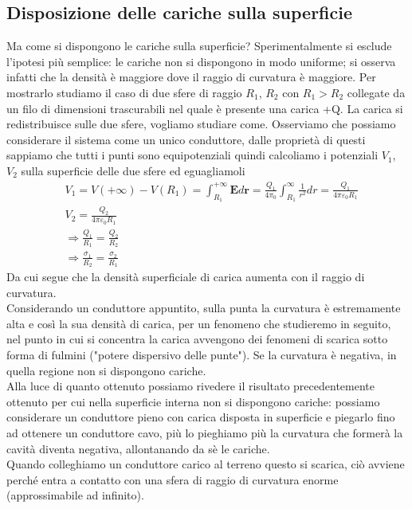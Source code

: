 \documentclass[10pt,a4paper]{article}
\begin{document}
\subsection{Disposizione delle cariche sulla superficie}
Ma come si dispongono le cariche sulla superficie? Sperimentalmente si esclude l'ipotesi più semplice: le cariche non si dispongono in modo uniforme; si osserva infatti che la densità è maggiore dove il raggio di curvatura è maggiore. Per mostrarlo studiamo il caso di due sfere di raggio \(R_1\), \(R_2\) con \(R_1>R_2\) collegate da un filo di dimensioni trascurabili nel quale è presente una carica +Q. La carica si redistribuisce sulle due sfere, vogliamo studiare come. Osserviamo che possiamo considerare il sistema come un unico conduttore, dalle proprietà di questi sappiamo che tutti i punti sono equipotenziali quindi calcoliamo i potenziali \(V_1\), \(V_2\) sulla superficie delle due sfere ed eguagliamoli
\begin{align*}
	&V_1 = V(+\infty) - V(R_1) = \int_{R_1}^{+\infty} \mathbf{E}d\mathbf{r} =  \frac{Q_1}{4\pi_0}\int_{R_1}^{\infty}\frac{1}{r^2}dr = \frac{Q_1}{4\pi\varepsilon_0R_1} \\
	&V_2 = \frac{Q_2}{4\pi\varepsilon_0R_1}\\
	&\Rightarrow \frac{Q_1}{R_1}= \frac{Q_2}{R_2}\\
	&\Rightarrow \frac{\sigma_1}{R_2} = \frac{\sigma_2}{R_1}
\end{align*}
Da cui segue che la densità superficiale di carica aumenta con il raggio di curvatura.\\
Considerando un conduttore appuntito, sulla punta la curvatura è estremamente alta e così la sua densità di carica, per un fenomeno che studieremo in seguito, nel punto in cui si concentra la carica avvengono dei fenomeni di scarica sotto forma di fulmini ("potere dispersivo delle punte"). Se la curvatura è negativa, in quella regione non si dispongono cariche.\\
Alla luce di quanto ottenuto possiamo rivedere il risultato precedentemente ottenuto per cui nella superficie interna non si dispongono cariche: possiamo considerare un conduttore pieno con carica disposta in superficie e piegarlo fino ad ottenere un conduttore cavo, più lo pieghiamo più la curvatura che formerà la cavità diventa negativa, allontanando da sè le cariche.\\
Quando colleghiamo un conduttore carico al terreno questo si scarica, ciò avviene perché entra a contatto con una sfera di raggio di curvatura enorme (approssimabile ad infinito). 
\end{document}
